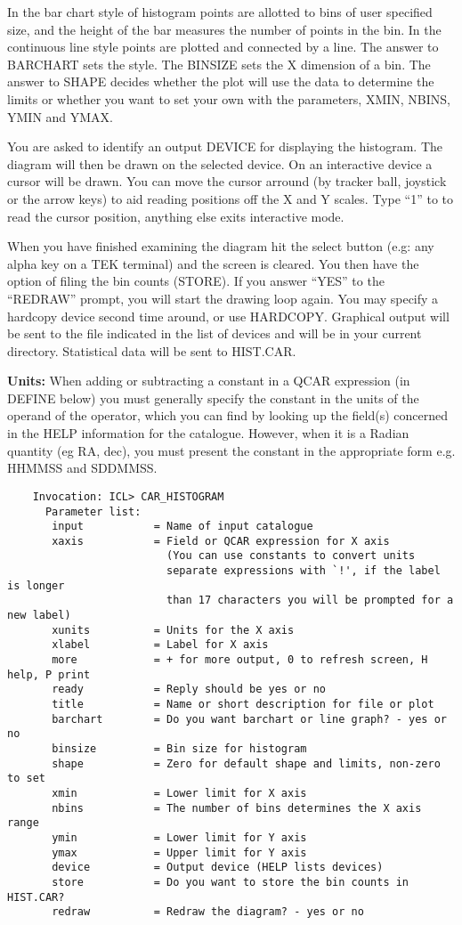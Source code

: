 In the bar chart style of histogram points are allotted to bins
of user specified size, and the height of the bar measures the
number of points in the bin.  
In the continuous line style points are plotted and connected by a 
line.  
The answer to BARCHART sets the style. 
The BINSIZE sets the X dimension of a bin.
The answer to SHAPE decides whether the plot will use the data to 
determine the limits or whether you want to set your own with the 
parameters, XMIN, NBINS, YMIN and YMAX.

You are asked to identify an output DEVICE for displaying the
histogram.
The diagram will then be drawn on the selected device.  
On an interactive device a cursor will be drawn.  
You can move the cursor arround (by tracker ball, joystick or the arrow 
keys) to aid reading positions off the X and Y scales. 
Type ``1'' to to read the cursor position, anything else exits 
interactive mode.

When you have finished examining the diagram hit the select button
(e.g: any alpha key on a TEK terminal) and the screen is cleared.
You then have the option of filing the bin counts (STORE).
If you answer ``YES'' to the ``REDRAW'' prompt, you will start the
drawing loop again.  
You may specify a hardcopy device second time around, or use HARDCOPY.
Graphical output will be sent to the file indicated in the list of
devices and will be in your current directory.
Statistical data will be sent to HIST.CAR.  

{\bf Units:} When adding or subtracting a constant in a QCAR expression (in
DEFINE below) you must generally specify the constant in the units of the 
operand of the operator, which you can find by looking up the field(s) concerned
in the HELP information for the catalogue.
However, when it is a Radian quantity (eg RA, dec), you must present the
constant in the appropriate form e.g. HHMMSS and SDDMMSS.
\begin{verbatim}
    Invocation: ICL> CAR_HISTOGRAM
      Parameter list:
       input           = Name of input catalogue
       xaxis           = Field or QCAR expression for X axis
                         (You can use constants to convert units
                         separate expressions with `!', if the label is longer
                         than 17 characters you will be prompted for a new label)
       xunits          = Units for the X axis
       xlabel          = Label for X axis
       more            = + for more output, 0 to refresh screen, H help, P print
       ready           = Reply should be yes or no
       title           = Name or short description for file or plot
       barchart        = Do you want barchart or line graph? - yes or no
       binsize         = Bin size for histogram
       shape           = Zero for default shape and limits, non-zero to set
       xmin            = Lower limit for X axis
       nbins           = The number of bins determines the X axis range
       ymin            = Lower limit for Y axis
       ymax            = Upper limit for Y axis
       device          = Output device (HELP lists devices)
       store           = Do you want to store the bin counts in HIST.CAR?
       redraw          = Redraw the diagram? - yes or no
\end{verbatim}

